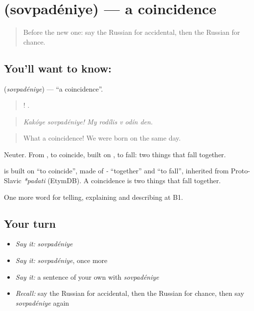 \section[\texorpdfstring{\ru{совпадение} (sovpadéniye)}{совпадение (sovpadéniye)}]{ (sovpadéniye) — a coincidence}

\label{lesson:RU-C355-sovpadenie}



\begin{quote}
Before the new one: say the Russian for accidental, then the Russian for chance.
\end{quote}

\subsection*{You'll want to know: }
\textbf{} (\emph{sovpadéniye}) — \textquotedblleft{}a coincidence\textquotedblright{}.

\begin{quote}
 !     .
\end{quote}

\begin{quote}
\emph{Kakóye sovpadéniye! My rodílis v odín den.}
\end{quote}

\begin{quote}
What a coincidence! We were born on the same day.
\end{quote}

Neuter. From \emph{}, to coincide, built on \emph{}, to fall: two things that fall together.

\begin{cousinweb}
\textbf{} is built on \emph{} \textquotedblleft{}to coincide\textquotedblright{}, made of \emph{-} \textquotedblleft{}together\textquotedblright{} and \emph{} \textquotedblleft{}to fall\textquotedblright{}, inherited from Proto-Slavic \emph{*padati} (EtymDB). A coincidence is two things that fall together.
\end{cousinweb}

\begin{grammarlens}[title={What you've built}]
One more word for telling, explaining and describing at B1.
\end{grammarlens}

\subsection*{Your turn}
\begin{itemize}
\raggedright
  \item \emph{Say it:} \emph{sovpadéniye}
  \item \emph{Say it:} \emph{sovpadéniye}, once more
  \item \emph{Say it:} a sentence of your own with \emph{sovpadéniye}
  \item \emph{Recall:} say the Russian for accidental, then the Russian for chance, then say \emph{sovpadéniye} again
\end{itemize}

